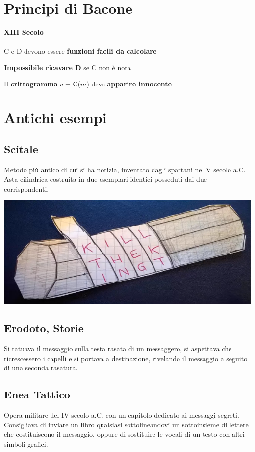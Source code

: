 \documentclass[10pt]{book}
\begin{document}
\section{Principi di Bacone}
\paragraph{XIII Secolo}
\begin{list}{}{}
	\item C e D devono essere \textbf{funzioni facili da calcolare}
	\item \textbf{Impossibile ricavare D} se C non è nota
	\item Il \textbf{crittogramma} $c$ = C($m$) deve \textbf{apparire innocente}
\end{list}
\section{Antichi esempi}
\subsection{Scitale}
Metodo più antico di cui si ha notizia, inventato dagli spartani nel V secolo a.C.\\
Asta cilindrica costruita in due esemplari identici posseduti dai due corrispondenti.
\begin{center}
	\includegraphics[scale=0.5]{2.png}
\end{center}
\subsection{Erodoto, Storie} Si tatuava il messaggio sulla testa rasata di un messaggero, si aspettava che ricrescessero i capelli e si portava a destinazione, rivelando il messaggio a seguito di una seconda rasatura.
\subsection{Enea Tattico}
Opera militare del IV secolo a.C. con un capitolo dedicato ai messaggi segreti. Consigliava di inviare un libro qualsiasi sottolineandovi un sottoinsieme di lettere che costituiscono il messaggio, oppure di sostituire le vocali di un testo con altri simboli grafici.
\end{document}
